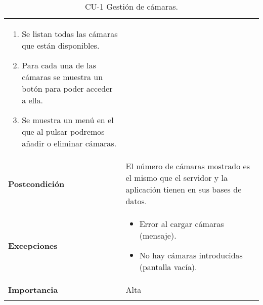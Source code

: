 \begin{longtable}[h!]{@{}ll@{}}
\begin{minipage}[t]{0.71\columnwidth}
\begin{enumerate}
\def\labelenumi{\arabic{enumi}.}
\tightlist
\item
  Se listan todas las cámaras que están disponibles.
\item
  Para cada una de las cámaras se muestra un botón para poder acceder a ella.
\item
  Se muestra un menú en el que al pulsar podremos añadir o eliminar cámaras.
\end{enumerate}\strut
\end{minipage}\tabularnewline
\begin{minipage}[t]{0.23\columnwidth}\raggedright\strut
\textbf{Postcondición}\strut
\end{minipage} & \begin{minipage}[t]{0.71\columnwidth}\raggedright\strut
El número de cámaras mostrado es el mismo que el servidor y la aplicación tienen en sus bases de datos.\strut
\end{minipage}\tabularnewline
\begin{minipage}[t]{0.23\columnwidth}\raggedright\strut
\textbf{Excepciones}\strut
\end{minipage} & \begin{minipage}[t]{0.71\columnwidth}\raggedright\strut
\begin{itemize}
\tightlist
\item
  Error al cargar cámaras (mensaje).
\item
  No hay cámaras introducidas (pantalla vacía).
\end{itemize}\strut
\end{minipage}\tabularnewline
\begin{minipage}[t]{0.23\columnwidth}\raggedright\strut
\textbf{Importancia}\strut
\end{minipage} & \begin{minipage}[t]{0.71\columnwidth}\raggedright\strut
Alta\strut
\end{minipage}\tabularnewline
\bottomrule
\caption{CU-1 Gestión de cámaras.}
\end{longtable}


